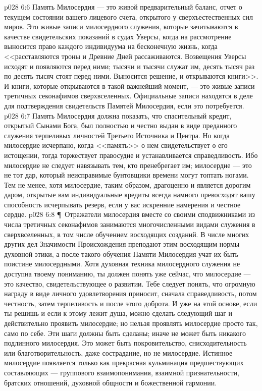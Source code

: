 \vs p028 6:6 Память Милосердия --- это живой предварительный баланс, отчет о текущем состоянии вашего лицевого счета, открытого у сверхъестественных сил миров. Это живые записи милосердного служения, которые зачитываются в качестве свидетельских показаний в судах Уверсы, когда на рассмотрение выносится право каждого индивидуума на бесконечную жизнь, когда <<расставляются троны и Древние Дней рассаживаются. Возвещения Уверсы исходят и появляются перед ними; тысячи и тысячи служат им, десять тысяч раз по десять тысяч стоят перед ними. Выносится решение, и открываются книги>>. И книги, которые открываются в такой важнейший момент, --- это живые записи третичных секонафимов сверхвселенных. Официальные записи находятся в деле для подтверждения свидетельств Памятей Милосердия, если это потребуется.
\vs p028 6:7 Память Милосердия должна показать, что спасительный кредит, открытый Сынами Бога, был полностью и честно выдан в виде преданного служения терпеливых личностей Третьего Источника и Центра. Но когда милосердие исчерпано, когда <<память>> о нем свидетельствует о его истощении, тогда торжествует правосудие и устанавливается справедливость. Ибо милосердие не следует навязывать тем, кто пренебрегает им; милосердие --- это не тот дар, который неисправимые бунтовщики времени могут топтать ногами. Тем не менее, хотя милосердие, таким образом, драгоценно и является дорогим даром, открытые вам индивидуальные кредиты всегда намного превосходят вашу способность исчерпывать резерв, если у вас искренние намерения и честное сердце.
\vs p028 6:8 \P\ Отражатели милосердия вместе со своими сподвижниками из числа третичных секонафимов занимаются многочисленными видами служения в сверхвселенных, в том числе обучением восходящих созданий. В числе многих других дел Значимости Происхождения преподают этим восходящим нормы духовной этики, а после такого обучения Памяти Милосердия учат их быть поистине милосердными. Хотя духовная техника милосердного служения не доступна твоему пониманию, ты должен понять уже сейчас, что милосердие --- это качество, свидетельствующее о развитии. Тебе следует понять, что огромную награду в виде личного удовлетворения приносит, сначала справедливость, потом честность, затем терпеливость и после этого доброта. И уже на этой основе, если ты решишь и если к этому лежит душа, можно сделать следующий шаг и действительно проявить милосердие; но нельзя проявлять милосердие просто так, само по себе. Эти шаги должны быть сделаны; иначе не может быть никакого подлинного милосердия. Это может быть покровительство, снисходительность или благотворительность, даже сострадание, но не милосердие. Истинное милосердие появляется только как прекрасная кульминация предшествующих составляющих --- группового взаимопонимания, взаимной признательности, братских отношений, духовной общности и божественной гармонии.
